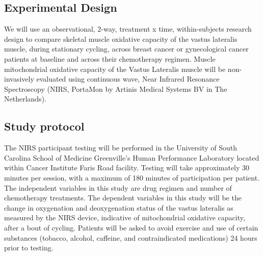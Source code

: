 \documentclass[
]{book}
\begin{document}
\hypertarget{Appendix-IRB-Protocol-ExperimentalDesign}{%
\subsection{Experimental Design}\label{Appendix-IRB-Protocol-ExperimentalDesign}}

We will use an observational, 2-way, treatment x time, within-subjects research design to compare skeletal muscle oxidative capacity of the vastus lateralis muscle, during stationary cycling, across breast cancer or gynecological cancer patients at baseline and across their chemotherapy regimen. Muscle mitochondrial oxidative capacity of the Vastus Lateralis muscle will be non-invasively evaluated using continuous wave, Near Infrared Resonance Spectroscopy (NIRS, PortaMon by Artinis Medical Systems BV in The Netherlands).

\hypertarget{Appendix-IRB-Protocol-StudyProtocol}{%
\subsection{Study protocol}\label{Appendix-IRB-Protocol-StudyProtocol}}

The NIRS participant testing will be performed in the University of South Carolina School of Medicine Greenville's Human Performance Laboratory located within Cancer Institute Faris Road facility. Testing will take approximately 30 minutes per session, with a maximum of 180 minutes of participation per patient. The independent variables in this study are drug regimen and number of chemotherapy treatments. The dependent variables in this study will be the change in oxygenation and deoxygenation status of the vastus lateralis as measured by the NIRS device, indicative of mitochondrial oxidative capacity, after a bout of cycling. Patients will be asked to avoid exercise and use of certain substances (tobacco, alcohol, caffeine, and contraindicated medications) 24 hours prior to testing.
\end{document}
